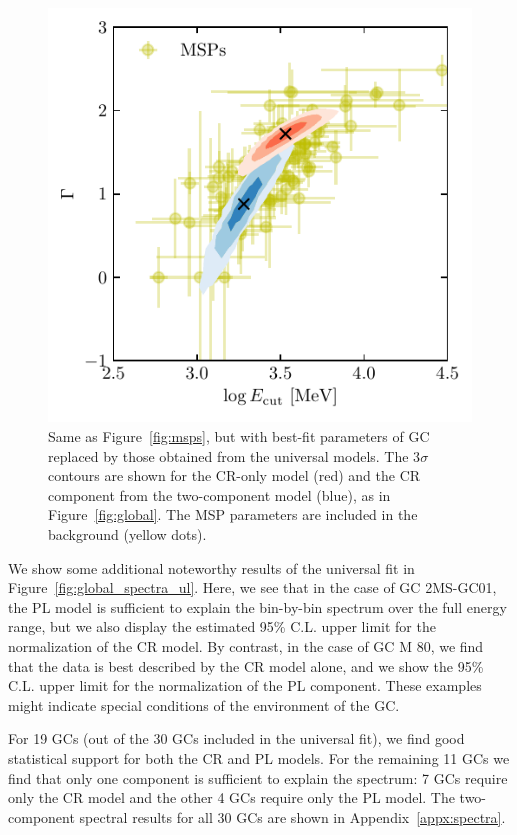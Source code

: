 \documentclass[doublespace,draft,nopageskip]{VTthesis} %
\begin{document}
\begin{figure}
    \centering
    \includegraphics[width=\columnwidth]{Figures/Globular/msp_vs_gc_global.pdf}
    \caption{Same as Figure~\ref{fig:msps}, but with best-fit parameters of GC replaced by those obtained from the universal models. The 3$\sigma$ contours are shown for the CR-only model (red) and the CR component from the two-component model (blue), as in Figure~\ref{fig:global}. The MSP parameters are included in the background (yellow dots).}
    \label{fig:msps_global}
\end{figure}

We show some additional noteworthy results of the universal fit in Figure~\ref{fig:global_spectra_ul}. Here, we see that in the case of GC 2MS-GC01, the {PL} model is sufficient to explain the bin-by-bin spectrum over the full energy range, but we also display the estimated 95\% C.L. upper limit for the normalization of the CR model. By contrast, in the case of GC M 80, we find that the data is best described by the CR model alone, and we show the 95\% C.L. upper limit for the normalization of the {PL} component. These examples might indicate special conditions of the environment of the GC.

For 19 GCs (out of the 30 GCs included in the universal fit), we find good statistical support for both the CR and {PL} models. For the remaining 11 GCs we find that only one component is sufficient to explain the spectrum: 7 GCs require only the CR model and the other 4 GCs require only the {PL} model. The two-component spectral results for all 30 GCs are shown in Appendix~\ref{appx:spectra}.
\end{document}
